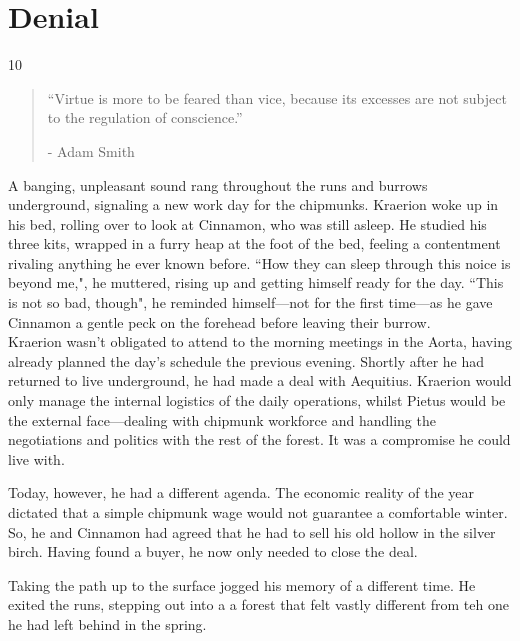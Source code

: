 \chapter{Denial} %

\vspace{-1.3cm}
\begin{localsize}{10}
    \begin{quote}
        “Virtue is more to be feared than vice, because its excesses are not subject to the regulation of conscience.”
        \begin{flushright}- Adam Smith \end{flushright}
    \end{quote}
\end{localsize}
\vspace{1cm}


A banging, unpleasant sound rang throughout the runs and burrows underground, signaling a new work day for the chipmunks. Kraerion woke up in his bed, rolling over to look at Cinnamon, who was still asleep. He studied his three kits, wrapped in a furry heap at the foot of the bed, feeling a contentment rivaling anything he ever known before. ``How they can sleep through this noice is beyond me,", he muttered, rising up and getting himself ready for the day. ``This is not so bad, though", he reminded himself---not for the first time---as he gave Cinnamon a gentle peck on the forehead before leaving their burrow.\\

Kraerion wasn't obligated to attend to the morning meetings in the Aorta, having already planned the day's schedule the previous evening. Shortly after he had returned to live underground, he had made a deal with Aequitius. Kraerion would only manage the internal logistics of the daily operations, whilst Pietus would be the external face---dealing with chipmunk workforce and handling the negotiations and politics with the rest of the forest. It was a compromise he could live with.

Today, however, he had a different agenda. The economic reality of the year dictated that a simple chipmunk wage would not guarantee a comfortable winter. So, he and Cinnamon had agreed that he had to sell his old hollow in the silver birch. Having found a buyer, he now only needed to close the deal.

Taking the path up to the surface jogged his memory of a different time. He exited the runs, stepping out into a a forest that felt vastly different from teh one he had left behind in the spring.

